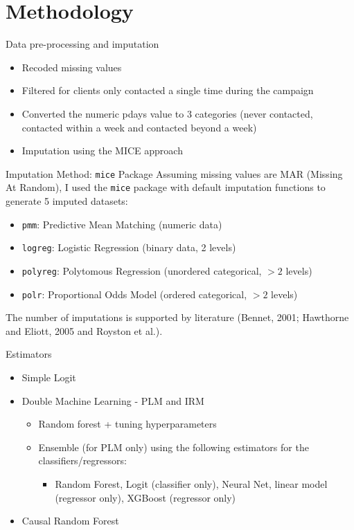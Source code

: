 \documentclass{beamer}
\begin{document}
\section{Methodology}

\begin{frame}{Data pre-processing and imputation}
\begin{itemize}
    \item Recoded missing values
    \item Filtered for clients only contacted a single time during the campaign
    \item Converted the numeric pdays value to 3 categories (never contacted, contacted within a week and contacted beyond a week)
    \item Imputation using the MICE approach
\end{itemize}
\end{frame}

\begin{frame}{Imputation Method: \texttt{mice} Package}
Assuming missing values are MAR (Missing At Random), I used the \texttt{mice} package with default imputation functions to generate 5 imputed datasets:
\begin{itemize}
	\small
    \item \texttt{pmm}: Predictive Mean Matching (numeric data)
    \item \texttt{logreg}: Logistic Regression (binary data, 2 levels)
    \item \texttt{polyreg}: Polytomous Regression (unordered categorical, $>2$ levels)
    \item \texttt{polr}: Proportional Odds Model (ordered categorical, $>2$ levels)
\end{itemize}

The number of imputations is supported by literature (Bennet, 2001; Hawthorne and Eliott, 2005 and Royston et al.).
\end{frame}

\begin{frame}{Estimators}

\begin{itemize}
    \item Simple Logit
    \item Double Machine Learning - PLM and IRM
    \begin{itemize}
        \item Random forest + tuning hyperparameters
        \item Ensemble (for PLM only) using the following estimators for the classifiers/regressors:
        \begin{itemize}
            \item Random Forest, Logit (classifier only), Neural Net, linear model (regressor only), XGBoost (regressor only)
        \end{itemize}
    \end{itemize}
    \item Causal Random Forest
\end{itemize}

\end{frame}
\end{document}
